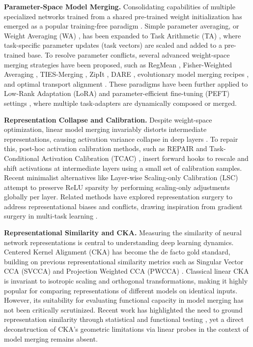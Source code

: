 \documentclass{article}
\theoremstyle{plain}
\theoremstyle{definition}
\theoremstyle{remark}
\begin{document}
\textbf{Parameter-Space Model Merging.} Consolidating capabilities of multiple specialized networks trained from a shared pre-trained weight initialization has emerged as a popular training-free paradigm \cite{mcmahan2017communication, wortsman2022model, wortsman2022robust}. Simple parameter averaging, or Weight Averaging (WA) \cite{izmailov2018averaging}, has been expanded to Task Arithmetic (TA) \cite{ilharco2022editing}, where task-specific parameter updates (task vectors) are scaled and added to a pre-trained base. To resolve parameter conflicts, several advanced weight-space merging strategies have been proposed, such as RegMean \cite{jin2022regmean}, Fisher-Weighted Averaging \cite{matena2022merging}, TIES-Merging \cite{yadav2023ties}, ZipIt \cite{stoica2023zipit}, DARE \cite{yu2024dare}, evolutionary model merging recipes \cite{akiba2024evolutionary}, and optimal transport alignment \cite{singh2020model}. These paradigms have been further applied to Low-Rank Adaptation (LoRA) and parameter-efficient fine-tuning (PEFT) settings \cite{hu2022lora, huang2023lorahub}, where multiple task-adapters are dynamically composed or merged.

\textbf{Representation Collapse and Calibration.} Despite weight-space optimization, linear model merging invariably distorts intermediate representations, causing activation variance collapse in deep layers \cite{jordan2023repair, ainsworth2022git, frankle2020linear}. To repair this, post-hoc activation calibration methods, such as REPAIR \cite{jordan2023repair} and Task-Conditional Activation Calibration (TCAC) \cite{yang2024adamerging}, insert forward hooks to rescale and shift activations at intermediate layers using a small set of calibration samples. Recent minimalist alternatives like Layer-wise Scaling-only Calibration (LSC) attempt to preserve ReLU sparsity by performing scaling-only adjustments globally per layer. Related methods have explored representation surgery \cite{yang2024representation} to address representational biases and conflicts, drawing inspiration from gradient surgery in multi-task learning \cite{yu2020gradient}.

\textbf{Representational Similarity and CKA.} Measuring the similarity of neural network representations is central to understanding deep learning dynamics. Centered Kernel Alignment (CKA) \cite{kornblith2019similarity} has become the de facto gold standard, building on previous representational similarity metrics such as Singular Vector CCA (SVCCA) \cite{raghu2017svcca} and Projection Weighted CCA (PWCCA) \cite{morcos2018pwcca}. Classical linear CKA is invariant to isotropic scaling and orthogonal transformations, making it highly popular for comparing representations of different models on identical inputs. However, its suitability for evaluating functional capacity in model merging has not been critically scrutinized. Recent work has highlighted the need to ground representation similarity through statistical and functional testing \cite{ding2021grounding}, yet a direct deconstruction of CKA's geometric limitations via linear probes \cite{alain2016understanding} in the context of model merging remains absent.
\end{document}
